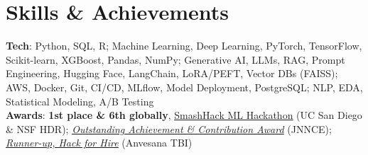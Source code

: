 \documentclass[letterpaper,11pt]{article}
\begin{document}
 
\section{Skills \& Achievements}
 \begin{itemize}[leftmargin=0.05in, label={}]
    \small{\item{
     \textbf{Tech}{: Python, SQL, R; Machine Learning, Deep Learning, PyTorch, TensorFlow, Scikit-learn, XGBoost, Pandas, NumPy; Generative AI, LLMs, RAG, Prompt Engineering, Hugging Face, LangChain, LoRA/PEFT, Vector DBs (FAISS); AWS, Docker, Git, CI/CD, MLflow, Model Deployment, PostgreSQL; NLP, EDA, Statistical Modeling, A/B Testing} \\
     \textbf{Awards}{: \textbf{1st place \& 6th globally}, \href{https://www.linkedin.com/posts/shashankrr_hackathon-machinelearning-climatetech-share-7422825761335779328-vGzB/}{\underline{SmashHack ML Hackathon}} (UC San Diego \& NSF HDR); {\href{https://www.linkedin.com/posts/shashankrr_its-an-honor-to-have-received-the-%F0%9D%90%8E%F0%9D%90%AE%F0%9D%90%AD-activity-7333911135571648512-0hvl}{\underline{\textit{Outstanding Achievement \& Contribution Award}}}} (JNNCE); {\href{https://www.linkedin.com/posts/shashankrr_im-incredibly-excited-to-announce-that-our-activity-7234227197241081856-bHR9}{\underline{\textit{Runner-up, Hack for Hire}}}} (Anvesana TBI)}
     }}
 \end{itemize}


\end{document}
